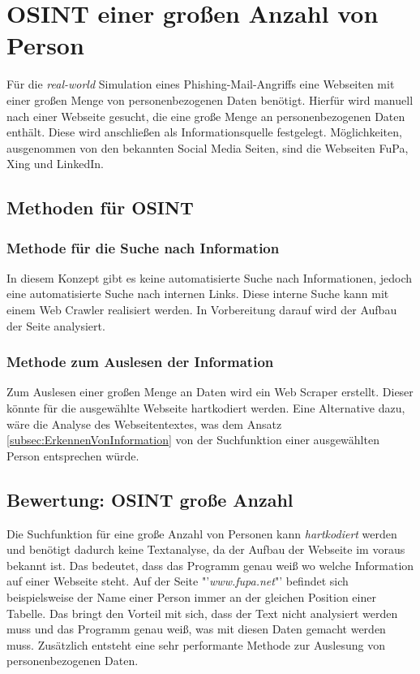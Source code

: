 
\chapter{OSINT einer großen Anzahl von Person}  %
\label{cha:Informationsbeschaffung einer grossen Anzahl von Person} %
Für die \textit{real-world} Simulation eines Phishing-Mail-Angriffs eine Webseiten mit einer großen Menge von personenbezogenen Daten benötigt. 	Hierfür wird manuell nach einer Webseite gesucht, die eine große Menge an personenbezogenen Daten enthält. Diese wird anschließen als Informationsquelle festgelegt. Möglichkeiten, ausgenommen von den bekannten Social Media Seiten, sind die Webseiten FuPa, Xing und LinkedIn.\\


\section{Methoden für OSINT}
	\subsection{Methode für die Suche nach Information}
	In diesem Konzept gibt es keine automatisierte Suche nach Informationen, jedoch eine automatisierte Suche nach internen Links. Diese interne Suche kann mit einem Web Crawler realisiert werden. In Vorbereitung darauf wird der Aufbau der Seite analysiert.\\

	\subsection{Methode zum Auslesen der Information}
	Zum Auslesen einer großen Menge an Daten wird ein Web Scraper erstellt. Dieser könnte für die ausgewählte Webseite hartkodiert werden. Eine Alternative dazu, wäre die Analyse des Webseitentextes, was dem Ansatz \ref{subsec:ErkennenVonInformation} von der Suchfunktion einer ausgewählten Person entsprechen würde.


\section{Bewertung: OSINT große Anzahl}
Die Suchfunktion für eine große Anzahl von Personen kann \textit{hartkodiert} werden und benötigt dadurch keine Textanalyse, da der Aufbau der Webseite im voraus bekannt ist. Das bedeutet, dass das Programm genau weiß wo welche Information auf einer Webseite steht. Auf der Seite "'\textit{www.fupa.net}"' befindet sich beispielsweise der Name einer Person immer an der gleichen Position einer Tabelle. Das bringt den Vorteil mit sich, dass der Text nicht analysiert werden muss und das Programm genau weiß, was mit diesen Daten gemacht werden muss. Zusätzlich entsteht eine sehr performante Methode zur Auslesung von personenbezogenen Daten.


